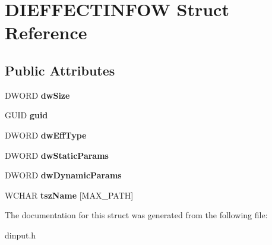 \hypertarget{struct_d_i_e_f_f_e_c_t_i_n_f_o_w}{\section{D\-I\-E\-F\-F\-E\-C\-T\-I\-N\-F\-O\-W Struct Reference}
\label{struct_d_i_e_f_f_e_c_t_i_n_f_o_w}
}
\subsection*{Public Attributes}
\begin{DoxyCompactItemize}
\item 
\hypertarget{struct_d_i_e_f_f_e_c_t_i_n_f_o_w_a820595aa7bc69a463565856e34daf4a5}{D\-W\-O\-R\-D {\bfseries dw\-Size}}\label{struct_d_i_e_f_f_e_c_t_i_n_f_o_w_a820595aa7bc69a463565856e34daf4a5}

\item 
\hypertarget{struct_d_i_e_f_f_e_c_t_i_n_f_o_w_a4696339b419d8ea35dc1d6e312c9ecb8}{G\-U\-I\-D {\bfseries guid}}\label{struct_d_i_e_f_f_e_c_t_i_n_f_o_w_a4696339b419d8ea35dc1d6e312c9ecb8}

\item 
\hypertarget{struct_d_i_e_f_f_e_c_t_i_n_f_o_w_acdb727d3626c2e5475549bf13dd2a8fb}{D\-W\-O\-R\-D {\bfseries dw\-Eff\-Type}}\label{struct_d_i_e_f_f_e_c_t_i_n_f_o_w_acdb727d3626c2e5475549bf13dd2a8fb}

\item 
\hypertarget{struct_d_i_e_f_f_e_c_t_i_n_f_o_w_a7fd9402627d981ee7e4ff926b277b609}{D\-W\-O\-R\-D {\bfseries dw\-Static\-Params}}\label{struct_d_i_e_f_f_e_c_t_i_n_f_o_w_a7fd9402627d981ee7e4ff926b277b609}

\item 
\hypertarget{struct_d_i_e_f_f_e_c_t_i_n_f_o_w_a5aa1820b19027c5638131493592ecfdd}{D\-W\-O\-R\-D {\bfseries dw\-Dynamic\-Params}}\label{struct_d_i_e_f_f_e_c_t_i_n_f_o_w_a5aa1820b19027c5638131493592ecfdd}

\item 
\hypertarget{struct_d_i_e_f_f_e_c_t_i_n_f_o_w_a8acc113a5531cfa393b6167466b9952c}{W\-C\-H\-A\-R {\bfseries tsz\-Name} \mbox{[}M\-A\-X\-\_\-\-P\-A\-T\-H\mbox{]}}\label{struct_d_i_e_f_f_e_c_t_i_n_f_o_w_a8acc113a5531cfa393b6167466b9952c}

\end{DoxyCompactItemize}


The documentation for this struct was generated from the following file\-:\begin{DoxyCompactItemize}
\item 
dinput.\-h\end{DoxyCompactItemize}

